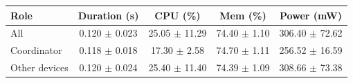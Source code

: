 \begin{tabular}{lcccc}
\hline
\textbf{Role} & \textbf{Duration (s)} & \textbf{CPU (\%)} & \textbf{Mem (\%)} & \textbf{Power (mW)} \\
\hline
All & 0.120 $\pm$ 0.023 & 25.05 $\pm$ 11.29 & 74.40 $\pm$ 1.10 & 306.40 $\pm$ 72.62 \\
Coordinator & 0.118 $\pm$ 0.018 & 17.30 $\pm$ 2.58 & 74.70 $\pm$ 1.11 & 256.52 $\pm$ 16.59 \\
Other devices & 0.120 $\pm$ 0.024 & 25.40 $\pm$ 11.40 & 74.39 $\pm$ 1.09 & 308.66 $\pm$ 73.38 \\
\hline
\end{tabular}
